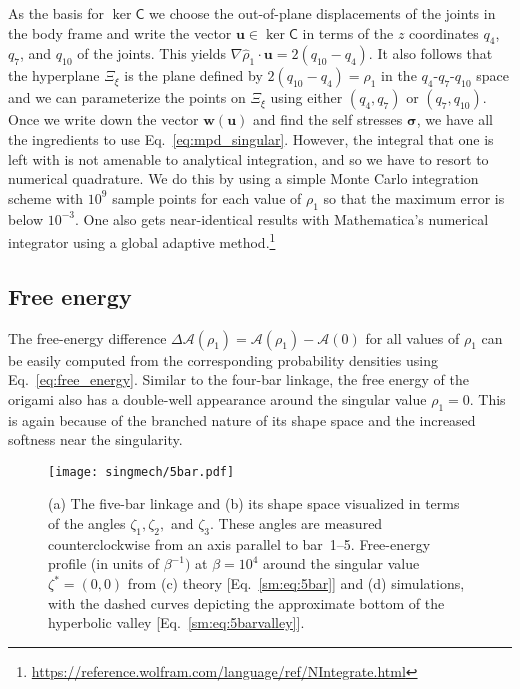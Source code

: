 As the basis for $\ker\mathsf{C}$ we choose the out-of-plane displacements of the joints in the body frame and write the vector $\bm{u} \in \ker \mathsf{C}$ in terms of the $z$ coordinates $q_{4}$, $q_{7}$, and $q_{10}$ of the joints.
This yields $\nabla\hat{\rho}_{1}\cdot\bm{u} = 2(q_{10} - q_{4})$.
It also follows that the hyperplane $\Xi_{\xi}$ is the plane defined by $2(q_{10} - q_{4}) = \rho_{1}$ in the $q_{4}$-$q_{7}$-$q_{10}$ space and we can parameterize the points on $\Xi_{\xi}$ using either $(q_{4}, q_{7})$ or $(q_{7}, q_{10})$.
Once we write down the vector $\bm{w}(\bm{u})$ and find the self stresses $\bm{\sigma}$, we have all the ingredients to use Eq.~\eqref{eq:mpd_singular}.
However, the integral that one is left with is not amenable to analytical integration, and so we have to resort to numerical quadrature.
We do this by using a simple Monte Carlo integration scheme with $10^{9}$ sample points for each value of $\rho_{1}$ so that the maximum error is below $10^{-3}$.
One also gets near-identical results with Mathematica's numerical integrator using a global adaptive method.\footnote{\url{https://reference.wolfram.com/language/ref/NIntegrate.html}}

\subsection{Free energy}

The free-energy difference $\Delta\mathscr{A}(\rho_{1}) = \mathscr{A}(\rho_{1}) - \mathscr{A}(0)$ for all values of $\rho_{1}$ can be easily computed from the corresponding probability densities using Eq.~\eqref{eq:free_energy}.
Similar to the four-bar linkage, the free energy of the origami also has a double-well appearance around the singular value $\rho_{1} = 0$.
This is again because of the branched nature of its shape space and the increased softness near the singularity.
%
\begin{figure}
  \begin{center}
    \texttt{[image: singmech/5bar.pdf]}
  \end{center}
  \caption{(a) The five-bar linkage and (b) its shape space visualized in terms of the angles $\zeta_{1}, \zeta_{2},$ and $\zeta_{3}$.  These angles are measured counterclockwise from an axis parallel to bar~1--5.  Free-energy profile (in units of $\beta^{-1})$ at $\beta = 10^{4}$ around the singular value $\zeta^{*} = (0, 0)$ from (c) theory [Eq.~\eqref{sm:eq:5bar}] and (d) simulations, with the dashed curves depicting the approximate bottom of the hyperbolic valley [Eq.~\eqref{sm:eq:5barvalley}].}
  \label{sm:fig:5bar}
\end{figure}

